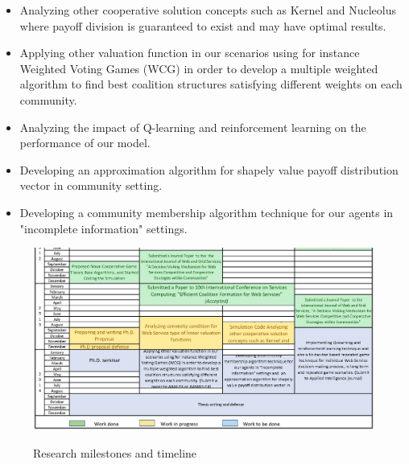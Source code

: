 \begin{itemize}
\item Analyzing other cooperative solution concepts such as Kernel
and Nucleolus where payoff division is guaranteed to exist and may
have optimal results.

\item Applying other valuation function in our scenarios using for
instance Weighted Voting Games (WCG) in order to develop a
multiple weighted algorithm to find best coalition structures
satisfying different weights on each community.

\item Analyzing the impact of Q-learning and reinforcement
learning on the performance of our model.

\item Developing an approximation algorithm for shapely value
payoff distribution vector in community setting.

\item Developing a community membership algorithm technique for
our agents in "incomplete information" settings.

\end{itemize}


    \begin{figure}
                \begin{center}
                \includegraphics[width=16cm]{timeline/timetable1.eps}\label{Timetable}
                \caption{Research milestones and timeline}
                \end{center}
    \end{figure}
